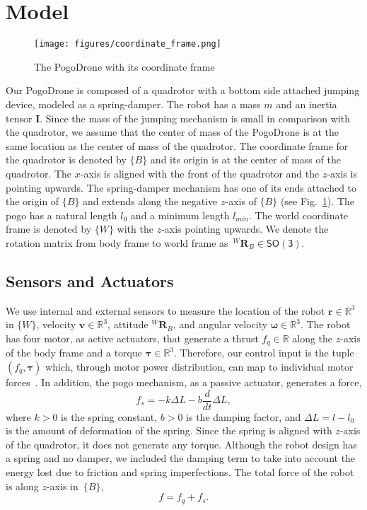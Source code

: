 \documentclass[letterpaper,10pt,conference]{ieeeconf}
\begin{document}
\section{Model}
\label{sec:Model}
\begin{figure}[t!]
    \center
    \texttt{[image: figures/coordinate\_frame.png]}
    \caption{The PogoDrone with its coordinate frame}
    \vspace{-1em}
    \label{fig:coordinatePic}
\end{figure}
\noindent
Our PogoDrone is composed of a quadrotor with a bottom side attached jumping device, modeled as a spring-damper. 
The robot has a mass $m$ and an inertia tensor $\boldsymbol I$. Since the mass of the jumping mechanism is small in comparison with the quadrotor, we assume that the center of mass of the PogoDrone is at the same location as the center of mass of the quadrotor.
The coordinate frame for the quadrotor is denoted by $\{B\}$ and its origin is at the center of mass of the quadrotor. 
The $x$-axis is aligned with the front of the quadrotor and the $z$-axis is pointing upwards. 
The spring-damper mechanism has one of its ends attached to the origin of $\{B\}$ and extends along the negative $z$-axis of $\{B\}$ (see Fig.~\ref{fig:coordinatePic}). The pogo has a natural length $l_0$ and a minimum length $l_{min}$.
The world coordinate frame is denoted by $\{W\}$ with the $z$-axis pointing upwards. We denote the rotation matrix from body frame to world frame as~${}^W\!\!\boldsymbol{R}\!_B\in\mathsf{SO(3)}$.

\subsection{Sensors and Actuators}
\noindent
We use internal and external sensors to measure the location of the robot $\boldsymbol{r}\in \mathbb{R}^3$ in $\{W\}$, velocity $\boldsymbol{v}\in\mathbb{R}^3$, attitude ${}^W\!\!\boldsymbol{R}\!_B$, and angular velocity $\boldsymbol{\omega}\in\mathbb{R}^3$.
%
The robot has four motor, as active actuators, that generate a thrust $f_q\in \mathbb{R}$ along the $z$-axis of the body frame and a torque $\boldsymbol\tau \in \mathbb{R}^3$.
Therefore, our control input is the tuple $(f_q, \boldsymbol\tau)$ which, through motor power distribution, can map to individual motor forces~\cite{5717652}.
In addition, the pogo mechanism, as a passive actuator, generates a force,
\begin{equation}
f_{s} = - k\Delta L - b\frac{d}{dt}\Delta L,
\label{eq:spring}
\end{equation}
where $k>0$ is the spring constant, $b>0$ is the damping factor, and $\Delta L=l - l_0$ is the amount of deformation of the spring. Since the spring is aligned with $z$-axis of the quadrotor, it does not generate any torque. Although the robot design has a spring and no damper, we included the damping term to take into account the energy lost due to friction and spring imperfections.
The total force of the robot is along $z$-axis in~$\{B\}$,
\begin{equation}
f = f_q + f_s.
\end{equation}
\end{document}
